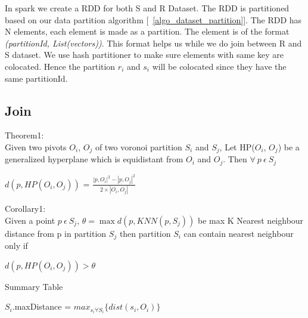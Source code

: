 In spark we create a RDD for both S and R Dataset. The RDD is
partitioned based on our data partition algorithm
[~\ref{algo_dataset_partition}]. The RDD has N elements, each element is
made as a partition. The element is of
the format \emph{(partitionId, List(vectors))}. This format helps us
while we do join between R and S dataset. We use hash partitioner to
make sure elements with same key are colocated. Hence the partition $r_i$ and
$s_i$ will be colocated since they have the same partitionId.

\subsection{Join}

\medskip

Theorem1: \cite{lu_efficient_2012} \\

Given two pivots $O_i$, $O_j$ of two voronoi
partition $S_i$ and $S_j$, Let HP($O_i$, $O_j$) be a generalized
hyperplane which is equidistant from $O_i$ and $O_j$. Then $\forall\ p\
\epsilon\ S_j$

\medskip

\begin{center}

$d(p, HP(O_i, O_j))$ = $\frac{|p, O_i|^2 - |p, O_j|^2}{2 \times |O_i, O_j|}$

\end{center}

\bigskip

Corollary1: \\

Given a point $p\ \epsilon\ S_j$, $\theta = \max{d(p, KNN(p, S_j))}$ be max K Nearest
neighbour distance from p in partition $S_j$ then partition
$S_i$ can contain nearest neighbour only if

\medskip

\begin{center}

$d(p, HP(O_i, O_j)) > \theta $

\end{center}

\medskip

\begin{algorithm}
  \caption{Summary Table}
  \label{algo_generate_summary}
  \begin{algorithmic}[1]
    \STATE $S_i$.maxDistance = $max_{s_i \forall S_i}\{dist(s_i, O_i)\}$
    \ENDFOR
  \end{algorithmic}
\end{algorithm}

